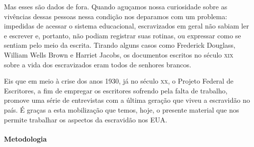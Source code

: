 \documentclass[11pt]{extarticle}
\begin{document}
Mas esses são dados de fora. Quando aguçamos nossa curiosidade sobre as vivências dessas pessoas
nessa  condição nos deparamos com um problema: impedidas de acessar o sistema educacional,
escravizados em geral não sabiam ler e escrever e, portanto, não podiam registrar suas rotinas,
ou expressar como se sentiam pelo meio da escrita. Tirando alguns casos como Frederick Douglass,
William Wells Brown e Harriet Jacobs, os documentos escritos no século \textsc{xix} sobre a vida dos escravizados
eram todos de senhores brancos. 

Eis que em meio à crise dos anos 1930, já no século \textsc{xx}, o Projeto Federal de Escritores, a fim de 
empregar os escritores sofrendo pela falta de trabalho, promove uma série de entrevistas com a
última geração que viveu a escravidão no país. É graças a esta mobilização que temos, hoje, 
o presente material que nos permite trabalhar os aspectos da escravidão nos EUA. 

\paragraph{Metodologia}
\end{document}
